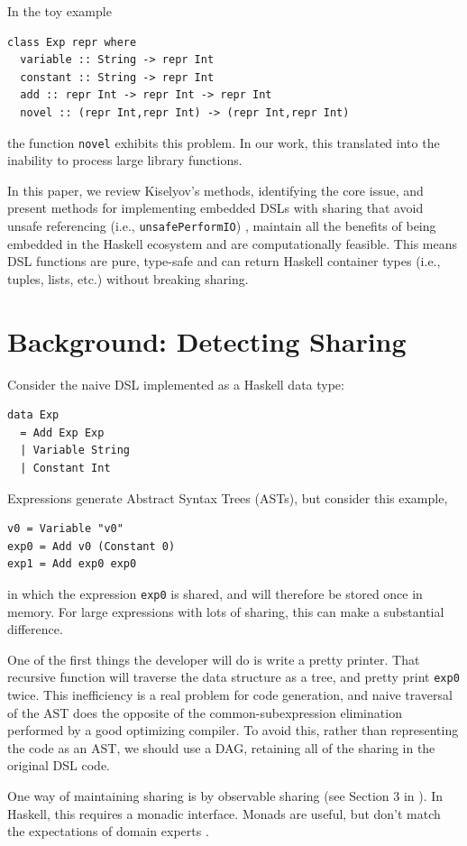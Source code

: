 \documentclass[runningheads]{llncs}
\begin{document}
In the toy example
\begin{verbatim}
class Exp repr where
  variable :: String -> repr Int
  constant :: String -> repr Int
  add :: repr Int -> repr Int -> repr Int
  novel :: (repr Int,repr Int) -> (repr Int,repr Int)
\end{verbatim}
the function \texttt{novel} exhibits this problem.
 In our work,
this translated into the inability to process large library functions.

\smallskip
In this paper, we review Kiselyov's methods, identifying the core issue, and
present methods for implementing embedded DSLs with sharing that avoid  unsafe referencing (i.e., \texttt{unsafePerformIO}) \cite{gill:observablesharing}, maintain all the benefits of being embedded in the Haskell ecosystem and are computationally feasible. This
means DSL functions are pure, type-safe and can return Haskell container types (i.e.,
tuples, lists, etc.) without breaking sharing.

\section{Background: Detecting Sharing}

Consider the naive DSL implemented as a Haskell data type:
\begin{verbatim}
data Exp
  = Add Exp Exp
  | Variable String
  | Constant Int
\end{verbatim}
Expressions generate Abstract Syntax Trees (ASTs),
but consider this example,
\begin{verbatim}
v0 = Variable "v0"
exp0 = Add v0 (Constant 0)
exp1 = Add exp0 exp0
\end{verbatim}
in which the expression  \texttt{exp0} is shared,
and will therefore be stored once in memory.
For large expressions with lots of sharing,
this can make a substantial difference.

One of the first things the developer will do is write a pretty printer.
That recursive function will traverse the data structure as a tree,
and pretty print \texttt{exp0} twice.
This inefficiency is a real problem for code generation,
and naive traversal of the AST does the opposite of the common-subexpression elimination performed by a good optimizing compiler.
To avoid this,
rather than representing the code as an AST, 
we should use a DAG, retaining all of the sharing in the original DSL code. 

One way of maintaining sharing is by observable sharing (see Section 3 in \cite{kiselyov:sharing}).
In Haskell, this requires a monadic interface.
Monads are useful, but don't match the expectations of domain experts \cite{odonnell:embedding}.
\end{document}
